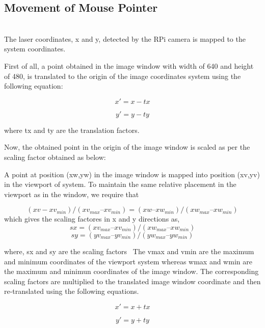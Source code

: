 \documentclass[12pt, a4paper]{article}
\begin{document}
{\subsection{Movement of Mouse Pointer}
~\\
The laser coordinates, x and y, detected by the RPi camera is mapped to the system coordinates. 

First of all, a point obtained in the image window with width of 640 and height of 480, is translated to the origin of the image coordinates system using the following equation:

\begin{equation}
x' = x - tx
\end{equation}

\begin{equation}
y' = y - ty
\end{equation}

where tx and ty are the translation factors.

Now, the obtained point in the origin of the image window is scaled as per the scaling factor obtained as below:

A point at position (xw,yw) in the image window is mapped into position (xv,yv) in the viewport of system. To maintain the same relative placement in the viewport as in the window, we require that

\begin{equation}
 (xv -xv_{min})/(xv_{max} – xv_{min}) = (xw – xw_{min})/(xw_{max} – xw_{min})
\end{equation}
which gives the scaling factores in x and y directions as,
\begin{equation}
sx = (xv_{max} – xv_{min}) / (xw_{max} – xw_{min})
\end{equation}
\begin{equation}
sy = (yv_{max} – yv_{min}) / (yw_{max} – yw_{min})
\end{equation}

where, sx and sy are the scaling factors~\cite{hen}
The vmax and vmin are the maximum and minimum coordinates of the viewport system whereas wmax and wmin are the maximum and minimun coordinates of the image window. 
The corresponding scaling factors are multiplied to the translated image window coordinate and then re-translated using the following equations. 

\begin{equation}
x' = x + tx
\end{equation}

\begin{equation}
y' = y + ty
\end{equation}

}
\end{document}

